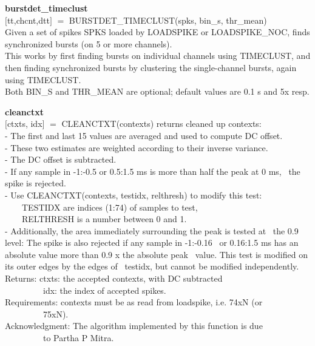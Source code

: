 \item {\bf burstdet\_timeclust}\\
{$[$}tt,chcnt,dtt{$]$} {$=$} BURSTDET\_TIMECLUST(spks, bin\_s, thr\_mean)
\\
Given a set of spikes SPKS loaded by LOADSPIKE or LOADSPIKE\_NOC, finds
synchronized bursts (on 5 or more channels).
\\
This works by first finding bursts on individual channels using TIMECLUST,
and then finding synchronized bursts by clustering the single-channel
bursts, again using TIMECLUST.
\\
Both BIN\_S and THR\_MEAN are optional; default values are 0.1 s and 5x
resp.

\item {\bf cleanctxt}\\
{$[$}ctxts, idx{$]$} {$=$} CLEANCTXT(contexts) returns cleaned up contexts:
\\
- The first and last 15 values are averaged and used to compute DC offset.
\\
- These two estimates are weighted according to their inverse variance.
\\
- The DC offset is subtracted.
\\
- If any sample in -1:-0.5 or 0.5:1.5 ms is more than half the peak at 0 ms,
 ~the spike is rejected.
\\
- Use CLEANCTXT(contexts, testidx, relthresh) to modify this test:
\\
\mbox{~}\mbox{~}\mbox{~}\mbox{~}TESTIDX are indices (1:74) of samples to test, 
\\
\mbox{~}\mbox{~}\mbox{~}\mbox{~}RELTHRESH is a number between 0 and 1.
\\
- Additionally, the area immediately surrounding the peak is tested at
 ~the 0.9 level: The spike is also rejected if any sample in -1:-0.16
 ~or 0.16:1.5 ms has an absolute value more than 0.9 x the absolute peak
 ~value. This test is modified on its outer edges by the edges of
 ~testidx, but cannot be modified independently.
\\
Returns: ctxts: the accepted contexts, with DC subtracted
\\
\mbox{~}\mbox{~}\mbox{~}\mbox{~}\mbox{~}\mbox{~}\mbox{~}\mbox{~}\mbox{~}idx: the index of accepted spikes.
\\
Requirements: contexts must be as read from loadspike, i.e. 74xN (or
\\
\mbox{~}\mbox{~}\mbox{~}\mbox{~}\mbox{~}\mbox{~}\mbox{~}\mbox{~}\mbox{~}75xN).
\\
Acknowledgment: The algorithm implemented by this function is due 
\\
\mbox{~}\mbox{~}\mbox{~}\mbox{~}\mbox{~}\mbox{~}\mbox{~}\mbox{~}\mbox{~}to Partha P Mitra.

